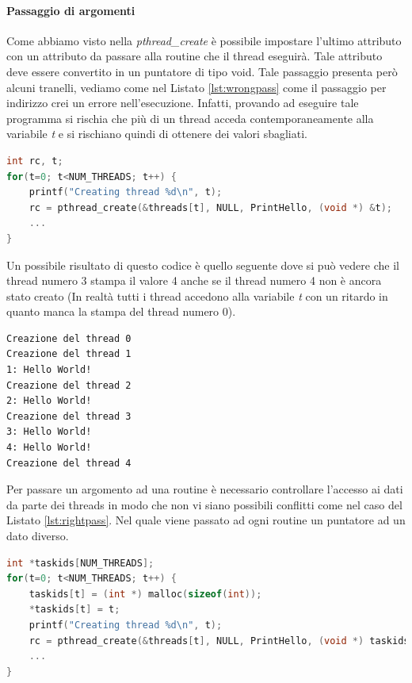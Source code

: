 \paragraph{Passaggio di argomenti}
Come abbiamo visto nella \emph{pthread\_create} è possibile impostare l'ultimo attributo con un attributo da passare alla routine che il thread eseguirà. Tale attributo deve essere convertito in un puntatore di tipo void. Tale passaggio presenta però alcuni tranelli, vediamo come nel Listato \ref{lst:wrongpass} come il passaggio per indirizzo crei un errore nell'esecuzione. Infatti, provando ad eseguire tale programma si rischia che più di un thread acceda contemporaneamente alla variabile \emph{t} e si rischiano quindi di ottenere dei valori sbagliati.
\begin{lstlisting}[language=C,caption={Errore nel passaggio di argomenti ad un thread},label=lst:wrongpass]
int rc, t;
for(t=0; t<NUM_THREADS; t++) {
	printf("Creating thread %d\n", t);
	rc = pthread_create(&threads[t], NULL, PrintHello, (void *) &t);
	...
}
\end{lstlisting}
Un possibile risultato di questo codice è quello seguente dove si può vedere che il thread numero 3 stampa il valore 4 anche se il thread numero 4 non è ancora stato creato (In realtà tutti i thread accedono alla variabile \emph{t} con un ritardo in quanto manca la stampa del thread numero 0).
\begin{verbatim}
Creazione del thread 0
Creazione del thread 1
1: Hello World!
Creazione del thread 2
2: Hello World!
Creazione del thread 3
3: Hello World!
4: Hello World!
Creazione del thread 4
\end{verbatim}
Per passare un argomento ad una routine è necessario controllare l'accesso ai dati da parte dei threads in modo che non vi siano possibili conflitti come nel caso del Listato \ref{lst:rightpass}. Nel quale viene passato ad ogni routine un puntatore ad un dato diverso.
\begin{lstlisting}[language=C,caption={Metodo corretto nel passaggio di argomenti ad un thread},label=lst:rightpass]
int *taskids[NUM_THREADS];
for(t=0; t<NUM_THREADS; t++) {
	taskids[t] = (int *) malloc(sizeof(int));
	*taskids[t] = t;
	printf("Creating thread %d\n", t);
	rc = pthread_create(&threads[t], NULL, PrintHello, (void *) taskids[t]);
	...
}
\end{lstlisting}
